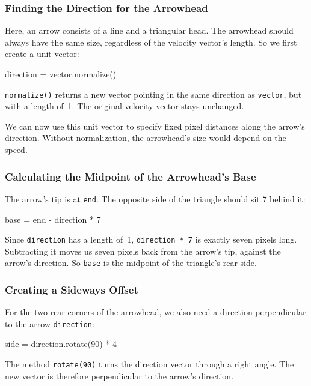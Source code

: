 \subsubsection*{Finding the Direction for the Arrowhead}

Here, an arrow consists of a line and a triangular head. The arrowhead should always have the same size, regardless of the velocity vector's length. So we first create a unit vector:
\begin{codebox}
	direction = vector.normalize()
\end{codebox}

\texttt{normalize()} returns a new vector pointing in the same direction as \texttt{vector}, but with a length of~1. The original velocity vector stays unchanged.

We can now use this unit vector to specify fixed pixel distances along the arrow's direction. Without normalization, the arrowhead's size would depend on the speed.

\newpage
\subsubsection*{Calculating the Midpoint of the Arrowhead's Base}

The arrow's tip is at \texttt{end}. The opposite side of the triangle should sit \SI{7}{\pixel} behind it:
\begin{codebox}
	base = end - direction * 7
\end{codebox}

Since \texttt{direction} has a length of~1, \texttt{direction * 7} is exactly seven pixels long. Subtracting it moves us seven pixels back from the arrow's tip, against the arrow's direction. So \texttt{base} is the midpoint of the triangle's rear side.

\subsubsection*{Creating a Sideways Offset}

For the two rear corners of the arrowhead, we also need a direction perpendicular to the arrow \texttt{direction}:
\begin{codebox}
	side = direction.rotate(90) * 4
\end{codebox}

The method \texttt{rotate(90)} turns the direction vector through a right angle. The new vector is therefore perpendicular to the arrow's direction.

